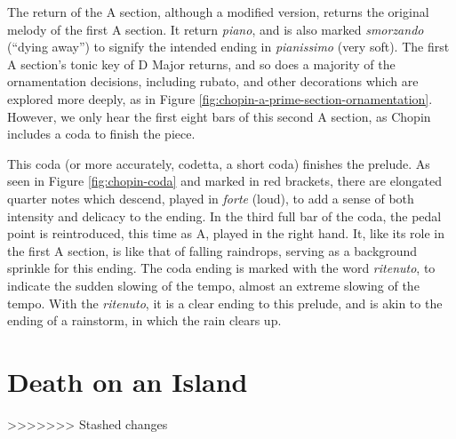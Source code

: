 The return of the A section, although a modified version, returns the original melody of the first A section. It return \textit{piano}, and is also marked \textit{smorzando} (``dying away'') to signify the intended ending in \textit{pianissimo} (very soft). The first A section's tonic key of D\musFlat{} Major returns, and so does a majority of the ornamentation decisions, including rubato, and other decorations which are explored more deeply, as in Figure \ref{fig:chopin-a-prime-section-ornamentation}\autocite{Hansen_1973}. However, we only hear the first eight bars of this second A section, as Chopin includes a coda to finish the piece.

This coda (or more accurately, codetta, a short coda) finishes the prelude. As seen in Figure \ref{fig:chopin-coda}\autocite{Hansen_1973} and marked in red brackets, there are elongated quarter notes which descend, played in \textit{forte} (loud), to add a sense of both intensity and delicacy to the ending. In the third full bar of the coda, the pedal point is reintroduced, this time as A\musFlat{}, played in the right hand. It, like its role in the first A section, is like that of falling raindrops, serving as a background sprinkle for this ending. The coda ending is marked with the word \textit{ritenuto}\autocite{Cole_Schwartz_Ritenuto}, to indicate the sudden slowing of the tempo, almost an extreme slowing of the tempo. With the \textit{ritenuto}, it is a clear ending to this prelude, and is akin to the ending of a rainstorm, in which the rain clears up.

\section{Death on an Island}\label{section:chopin-interpretation}


%
>>>>>>> Stashed changes
